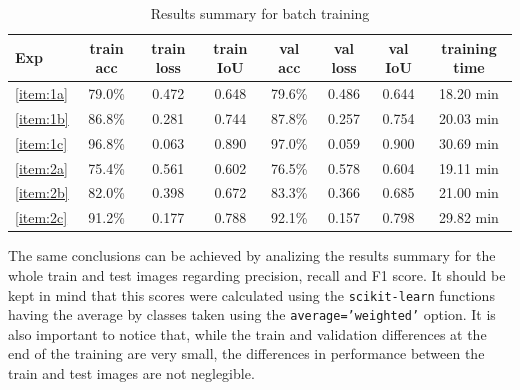 \documentclass[10pt, a4paper]{article}
\begin{document}
\begin{table}[htpb]
  \centering
  \begin{tabular}{l|c|c|c|c|c|c|c|}
    Exp             &	train acc	      & train loss	& train IoU  & val acc & val loss	 & val IoU & training time \\
    \hline
    \ref{item:1a}   & 79.0\%          & 0.472       & 0.648      & 79.6\%  & 0.486     & 0.644   & 18.20 min     \\
    \ref{item:1b}   & 86.8\%          & 0.281       & 0.744      & 87.8\%  & 0.257     & 0.754   & 20.03 min     \\
    \ref{item:1c}   & 96.8\%          & 0.063       & 0.890      & 97.0\%  & 0.059     & 0.900   & 30.69 min     \\
    \ref{item:2a}   & 75.4\%          & 0.561       & 0.602      & 76.5\%  & 0.578     & 0.604   & 19.11 min     \\
    \ref{item:2b}   & 82.0\%          & 0.398       & 0.672      & 83.3\%  & 0.366     & 0.685   & 21.00 min     \\
    \ref{item:2c}   & 91.2\%          & 0.177       & 0.788      & 92.1\%  & 0.157     & 0.798   & 29.82 min     \\
    \hline
  \end{tabular}
  \caption{Results summary for batch training}
  \label{tab:batch_results_summ}
\end{table}

The same conclusions can be achieved by analizing the results summary for the whole train and test images regarding precision, recall and F1 score. It should be
kept in mind that this scores were calculated using the {\tt scikit-learn} functions having the average by classes taken using the {\tt average='weighted'} option.
It is also important to notice that, while the train and validation differences at the end of the training are very small, the differences in performance between
the train and test images are not neglegible.
\end{document}
